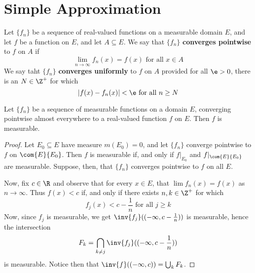 \section{Simple Approximation}

\begin{definition}
    Let $\{f_n\}$ be a sequence of real-valued functions on a measurable domain
    $E$, and let  $f$ be a function on  $E$, and let  $A \subseteq E$. We say
    that $\{f_n\}$ \textbf{converges pointwise} to $f$ on  $A$ if
    \begin{equation*}
        \lim_{n \xrightarrow{} \infty}{f_n(x)}=f(x) \text{ for all } x \in A
    \end{equation*}
    We say taht $\{f_n\}$ \textbf{converges uniformly} to $f$ on  $A$ provided
    for all $\e>0$, there is an  $N \in \Z^+$ for which
    \begin{equation*}
        |f(x)-f_n(x)|<\e \text{ for all } n \geq N
    \end{equation*}
\end{definition}

\begin{lemma}\label{9.2.1}
    Let $\{f_n\}$ be a sequence of measurable functions on a domain $E$,
    converging pointwise almost everywhere to a real-valued function  $f$ on $E$.
    Then  $f$ is measurable.
\end{lemma}
\begin{proof}
    Let $E_0 \subseteq E$ have measure $m(E_0)=0$, and let $\{f_n\}$ converge
    pointwise to $f$ on  $\com{E}{E_0}$. Then $f$ is measurable if, and only if
    $f|_{E_0}$ and $f|_{\com{E}{E_0}}$ are measurable. Suppose, then, that
    $\{f_n\}$ converges pointwise to $f$ on all  $E$.

    Now, fix $c \in \R$ and observe that for every  $x \in E$, that
    $\lim{f_n(x)}=f(x)$ as $n \xrightarrow{} \infty$. Thus  $f(x)<c$ if, and
    only if there exists $n,k \in \Z^+$ for which
    \begin{equation*}
        f_j(x)<c-\frac{1}{n} \text{ for all } j \geq k
    \end{equation*}
    Now, since $f_j$ is measurable, we get  $\inv{f_j}((-\infty,c-\frac{1}{n}))$
    is measurable, hence the intersection
    \begin{equation*}
        F_k=\bigcap_{k \neq j}{\inv{f_j}((-\infty,c-\frac{1}{n}))}
    \end{equation*}
    is measurable. Notice then that $\inv{f}((-\infty,c))=\bigcup_{k}{F_k}$.
\end{proof}

